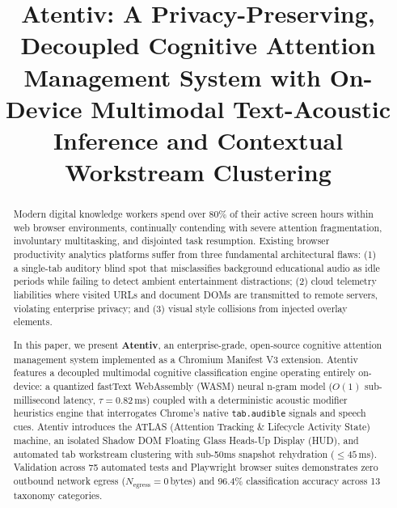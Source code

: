 \documentclass[conference]{IEEEtran}
\begin{document}
\title{Atentiv: A Privacy-Preserving, Decoupled Cognitive Attention Management System with On-Device Multimodal Text-Acoustic Inference and Contextual Workstream Clustering}

\author{
}

\maketitle

\begin{abstract}
Modern digital knowledge workers spend over 80\% of their active screen hours within web browser environments, continually contending with severe attention fragmentation, involuntary multitasking, and disjointed task resumption. Existing browser productivity analytics platforms suffer from three fundamental architectural flaws: (1) a single-tab auditory blind spot that misclassifies background educational audio as idle periods while failing to detect ambient entertainment distractions; (2) cloud telemetry liabilities where visited URLs and document DOMs are transmitted to remote servers, violating enterprise privacy; and (3) visual style collisions from injected overlay elements.

In this paper, we present \textbf{Atentiv}, an enterprise-grade, open-source cognitive attention management system implemented as a Chromium Manifest V3 extension. Atentiv features a decoupled multimodal cognitive classification engine operating entirely on-device: a quantized fastText WebAssembly (WASM) neural n-gram model ($O(1)$ sub-millisecond latency, $\tau = 0.82$\,ms) coupled with a deterministic acoustic modifier heuristics engine that interrogates Chrome's native \texttt{tab.audible} signals and speech cues. Atentiv introduces the ATLAS (Attention Tracking \& Lifecycle Activity State) machine, an isolated Shadow DOM Floating Glass Heads-Up Display (HUD), and automated tab workstream clustering with sub-50ms snapshot rehydration ($\le 45$\,ms). Validation across 75 automated tests and Playwright browser suites demonstrates zero outbound network egress ($N_{\text{egress}} = 0$\,bytes) and 96.4\% classification accuracy across 13 taxonomy categories.
\end{abstract}
\end{document}
